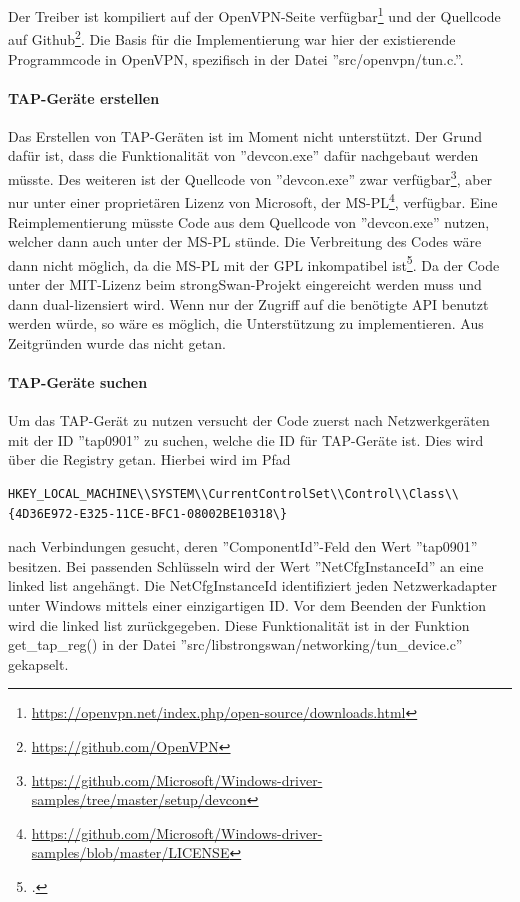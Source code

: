 {%
Der Treiber ist kompiliert auf der OpenVPN-Seite
verfügbar\footnote{\url{https://openvpn.net/index.php/open-source/downloads.html}}
und der Quellcode auf Github\footnote{\url{https://github.com/OpenVPN}}.
Die Basis für die Implementierung war hier der existierende Programmcode in
OpenVPN, spezifisch in  der Datei ''src/openvpn/tun.c.''.

\paragraph{TAP-Geräte erstellen}
Das Erstellen von TAP-Geräten ist im Moment nicht unterstützt. Der Grund dafür ist,
dass die Funktionalität von ''devcon.exe'' dafür nachgebaut werden müsste.
Des weiteren ist der Quellcode von ''devcon.exe'' zwar verfügbar\footnote{\url{https://github.com/Microsoft/Windows-driver-samples/tree/master/setup/devcon}},
aber nur unter einer proprietären Lizenz von Microsoft, der MS-PL\footnote{\url{https://github.com/Microsoft/Windows-driver-samples/blob/master/LICENSE}},
verfügbar. Eine Reimplementierung müsste Code aus dem Quellcode von ''devcon.exe'' nutzen,
welcher dann auch unter der MS-PL stünde. Die Verbreitung des Codes wäre dann nicht möglich,
da die MS-PL mit der GPL inkompatibel ist\footcite[][]{_gnu.org_2016}.
Da der Code unter der MIT-Lizenz beim strongSwan-Projekt eingereicht werden muss
und dann dual-lizensiert wird.
Wenn nur der Zugriff auf die benötigte API benutzt werden würde, so wäre es möglich,
die Unterstützung zu implementieren. Aus Zeitgründen wurde das nicht getan.

\paragraph{TAP-Geräte suchen}
Um das TAP-Gerät zu nutzen versucht der Code zuerst nach Netzwerkgeräten mit der ID ''tap0901'' zu suchen,
welche die ID für TAP-Geräte ist. Dies wird über die Registry getan. Hierbei wird
im Pfad \begin{lstlisting}[numbers=none]
HKEY_LOCAL_MACHINE\\SYSTEM\\CurrentControlSet\\Control\\Class\\{4D36E972-E325-11CE-BFC1-08002BE10318\}
\end{lstlisting}
nach Verbindungen gesucht, deren ''ComponentId''-Feld den Wert ''tap0901'' besitzen.
Bei passenden Schlüsseln wird der Wert ''NetCfgInstanceId'' an eine linked list
angehängt. Die NetCfgInstanceId identifiziert jeden Netzwerkadapter unter Windows
mittels einer einzigartigen ID.
Vor dem Beenden der Funktion wird die linked list zurückgegeben.
Diese Funktionalität ist in der Funktion get\_tap\_reg() in der Datei
''src/libstrongswan/networking/tun\_device.c'' gekapselt.

}
